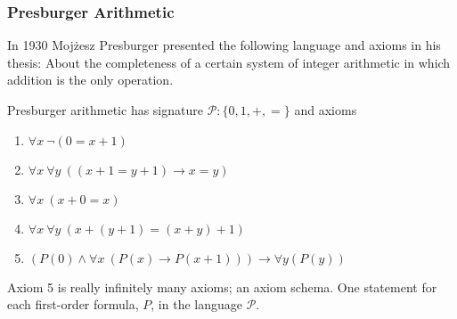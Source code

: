 \documentclass{beamer}
\begin{document}
\begin{frame}
	\frametitle{Presburger Arithmetic}
	
	In 1930 Moj\.{z}esz Presburger presented the following language and axioms in his thesis: About the completeness of a certain system of integer arithmetic in which addition is the only operation.
	
	\vspace{0.2cm}
	
	Presburger arithmetic has signature $\mathcal{P}: \{0,1,+,=\}$ and axioms
	
	\vspace{0.2cm}
	
	\begin{enumerate}
		\item $\forall x \ \lnot(0 = x + 1)$
		\item $\forall x \ \forall y \ ((x + 1  = y + 1) \rightarrow x = y)$
		\item $\forall x \ (x + 0 = x)$
		\item $\forall x \ \forall y \ (x + (y + 1) = (x + y) + 1)$
		\item $(P(0) \land \forall x \ (P(x) \to P(x+1))) \rightarrow \forall y (P(y))$
	\end{enumerate}

	\vspace{0.2cm}

	Axiom 5 is really infinitely many axioms; an axiom schema. One statement for each first-order formula, $P$, in the language $\mathcal{P}$.  
	
	
\end{frame}
\end{document}
